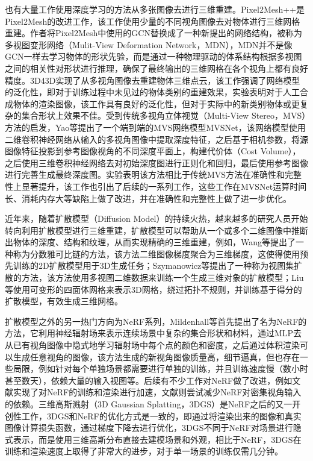 也有大量工作使用深度学习的方法从多张图像去进行三维重建。Pixel2Mesh++\cite{wen2019pixel2mesh++}是Pixel2Mesh的改进工作，该工作使用少量的不同视角图像去对物体进行三维网格重建。作者将Pixel2Mesh中使用的GCN替换成了一种新提出的网络结构，被称为多视图变形网络（Mulit-View Deformation Network，MDN），MDN并不是像GCN一样去学习物体的形状先验，而是通过一种物理驱动的体系结构根据多视图之间的相关性对形状进行推理，确保了最终输出的三维网格在各个视角上都有良好精度。3D43D\cite{bautista2021generalization}实现了从多视角图像去重建物体三维点云，该工作强调了网络模型的泛化性，即对于训练过程中未见过的物体类别的重建效果\cite{thai20213d}，实验表明对于人工合成物体的渲染图像，该工作具有良好的泛化性，但对于实际中的新类别物体或更复杂的集合形状上效果不佳\cite{collins2022abo}。受到传统多视角立体视觉（Multi-View Stereo，MVS）方法的启发，Yao等\cite{yao2018mvsnet}提出了一个端到端的MVS网络模型MVSNet，该网络模型使用二维卷积神经网络从输入的多视角图像中提取深度特征，之后基于相机参数，将源图像特征投影到参考图像视角的不同深度平面上，构建代价体（Cost Volume），之后使用三维卷积神经网络去对初始深度图进行正则化和回归，最后使用参考图像进行完善生成最终深度图。实验表明该方法相比于传统MVS方法在准确性和完整性上显著提升，该工作也引出了后续的一系列工作\cite{yang2020cost,yu2020fast,yi2020pyramid,wei2021aa,ma2021epp}，这些工作在MVSNet运算时间长、消耗内存大等缺陷上做了改进，并在准确性和完整性上做了进一步优化。

近年来，随着扩散模型（Diffusion Model）的持续火热，越来越多的研究人员开始转向利用扩散模型进行三维重建\parencite{long2024wonder3d,hu2024efficientdreamer,melas2023realfusion,liu2023one}，扩散模型可以帮助从一个或多个二维图像中推断出物体的深度、结构和纹理，从而实现精确的三维重建，例如，Wang等\cite{wang2023score}提出了一种称为分数雅可比链的方法，该方法二维图像梯度聚合为三维梯度，这使得使用预先训练的2D扩散模型用于3D生成任务；Szymanowicz等\cite{szymanowicz2023viewset}提出了一种称为视图集扩散的方法，该方法使用多视图二维数据来训练一个生成三维对象的扩散模型；Liu等\cite{liu2023meshdiffusion}使用可变形的四面体网格来表示3D网格，绕过拓扑不规则，并训练基于得分的扩散模型，有效生成三维网格。

扩散模型之外的另一热门方向为NeRF系列，Mildenhall等\cite{mildenhall2021nerf}首先提出了名为NeRF的方法，它利用神经辐射场来表示连续场景中复杂的集合形状和材料，通过MLP去从已有视角图像中隐式地学习辐射场中每个点的颜色和密度，之后通过体积渲染可以生成任意视角的图像，该方法生成的新视角图像质量高，细节逼真，但也存在一些局限，例如针对每个单独场景都需要进行单独的训练，并且训练速度慢（数小时甚至数天），依赖大量的输入视图等。后续有不少工作对NeRF做了改进，例如文献\parencite{muller2022instant, fridovich2022plenoxels, chen2022tensorf}实现了对NeRF的训练和渲染进行加速，文献\parencite{yu2021pixelnerf, niemeyer2022regnerf}则尝试减少NeRF对密集视角输入的依赖。三维高斯溅射（3D Gaussian Splatting，3DGS）\cite{kerbl20233d}是NeRF之后的又一开创性工作，3DGS和NeRF的优化方式是一致的，即通过将渲染出来的图像和真实图像计算损失函数，通过梯度下降去进行优化，3DGS不同于NeRF对场景进行隐式表示，而是使用三维高斯分布直接去建模场景和外观，相比于NeRF，3DGS在训练和渲染速度上取得了非常大的进步，对于单一场景的训练仅需几分钟。

